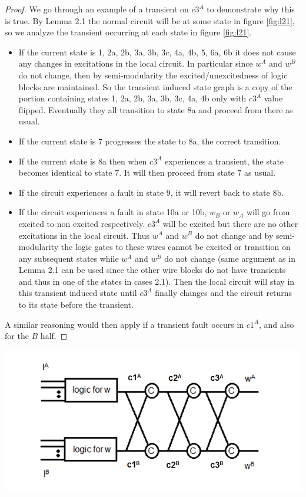 \documentclass[12pt]{report}
\begin{document}
\begin{proof}
We go through an example of a transient on $c3^A$ to demonstrate why this is true.  By Lemma 2.1 the normal circuit will be at some state in figure \ref{fig:l21}, so we analyze the transient occurring at each state in figure \ref{fig:l21}.
\begin{itemize}
	\item
If the current state is 1, 2a, 2b, 3a, 3b, 3c, 4a, 4b, 5, 6a, 6b it does not cause any changes in excitations in the local circuit.  In particular since $w^A$ and $w^B$ do not change, then by semi-modularity the excited/unexcitedness of logic blocks are maintained.  So the transient induced state graph is a copy of the portion containing states 1, 2a, 2b, 3a, 3b, 3c, 4a, 4b only with $c3^A$ value flipped. Eventually they all transition to state 8a and proceed from there as usual.
	\item
If the current state is 7 progresses the state to 8a, the correct transition.	
	\item
      If the current state is 8a then when $c3^A$ experiences a transient, the state
 becomes identical to state 7.  It will then proceed from state 7 as usual.   
	\item
If the circuit experiences a fault in state 9, it will revert back to state 8b.  
	\item
If the circuit experiences a fault in state 10a or 10b, $w_B$ or $w_A$ will go from excited to non excited respectively.  $c3^A$ will be excited but there are no other excitations in the local circuit.  Thus $w^A$ and $w^B$ do not change and by semi-modularity the logic gates to these wires cannot be excited or transition on any subsequent states while $w^A$ and $w^B$ do not change (same argument as in Lemma 2.1 can be used since the other wire blocks do not have transients and thus in one of the states in cases 2.1).  Then the local circuit will stay in this transient induced state until $c3^A$ finally changes and the circuit returns to its state before the transient.
\end{itemize}
A similar reasoning would then apply if a transient fault occurs in $c1^A$, and also for the $B$ half.  
\end{proof}

\includegraphics[width=.8\textwidth]{gatew}
\end{document}
